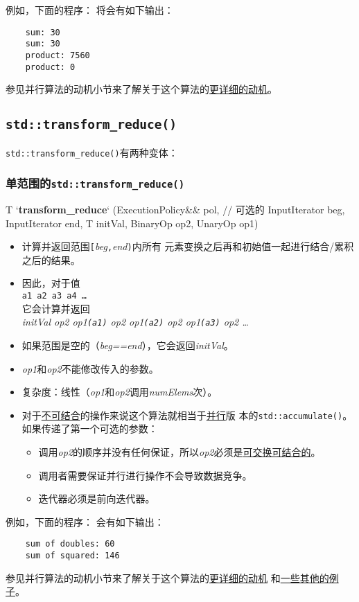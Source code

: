 例如，下面的程序：
将会有如下输出：
\begin{lstlisting}
    sum: 30
    sum: 30
    product: 7560
    product: 0
\end{lstlisting}
参见并行算法的动机小节来了解关于这个算法的\hyperref[ch22.6.1]{更详细的动机}。

\subsection{\texttt{std::transform\_reduce()}}\label{ch23.2.2}
\texttt{std::transform\_reduce()}有两种变体：

\subsubsection{单范围的\texttt{std::transform\_reduce()}}
\begin{blacklisting}
T
`\textbf{transform\_reduce}` (ExecutionPolicy&& pol,    // 可选的
                  InputIterator beg, InputIterator end,
                  T initVal,
                  BinaryOp op2, UnaryOp op1)
\end{blacklisting}
\begin{itemize}
    \item 计算并返回范围\texttt{[}\emph{beg}\texttt{,}\emph{end}\texttt{)}内所有
    元素变换之后再和初始值一起进行结合/累积之后的结果。
    \item 因此，对于值\\
    \hspace*{2em}\texttt{a1 a2 a3 a4 \ldots}\\
    它会计算并返回\\
    \hspace*{2em}\emph{initVal op2 op1\texttt{(a1)} op2 op1\texttt{(a2)} op2 op1\texttt{(a3)} op2 \ldots}
    \item 如果范围是空的（\emph{beg==end}），它会返回\emph{initVal}。
    \item \emph{op1}和\emph{op2}不能修改传入的参数。
    \item 复杂度：线性（\emph{op1}和\emph{op2}调用\emph{numElems}次）。
    \item 对于\hyperref[ch22.6.1.3]{不可结合}的操作来说这个算法就相当于\hyperref[ch22]{并行}版
    本的\texttt{std::accumulate()}。如果传递了第一个可选的参数：
    \begin{itemize}
        \item 调用\emph{op2}的顺序并没有任何保证，所以\emph{op2}必须是\hyperref[ch22.6.1.1]{可交换可结合的}。
        \item 调用者需要保证并行进行操作不会导致数据竞争。
        \item 迭代器必须是前向迭代器。
    \end{itemize}
\end{itemize}
例如，下面的程序：
会有如下输出：
\begin{lstlisting}
    sum of doubles: 60
    sum of squared: 146
\end{lstlisting}
参见并行算法的动机小节来了解关于这个算法的\hyperref[transform动机]{更详细的动机}
和\hyperref[ch22.6.1.4]{一些其他的例子}。

